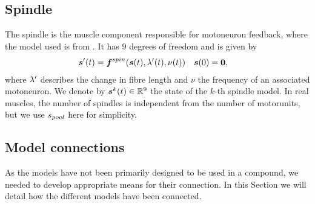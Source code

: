 \subsection{Spindle}
The spindle is the muscle component responsible for motoneuron feedback, where the model used is from \cite{Mileusnic2006}.
It has $9$ degrees of freedom and is given by
\begin{align}
	\boldsymbol{s}'(t) &= \boldsymbol{f}^{spin}(\boldsymbol{s}(t),\lambda'(t),\nu(t)) & \boldsymbol{s}(0) &= \boldsymbol{0},\label{def:spindlesys}
\end{align}
where $\lambda'$ describes the change in fibre length and $\nu$ the frequency of an associated motoneuron.
We denote by $\boldsymbol{s}^k(t)\in\mathbb{R}^9$ the state of the $k$-th spindle model. In real muscles, the number of spindles is independent from the
number of motorunits, but we use ${s_{pool}}$ here for simplicity.

\subsection{Model connections}
As the models have not been primarily designed to be used in a compound, we needed to develop appropriate means for their connection.
In this Section we will detail how the different models have been connected.

